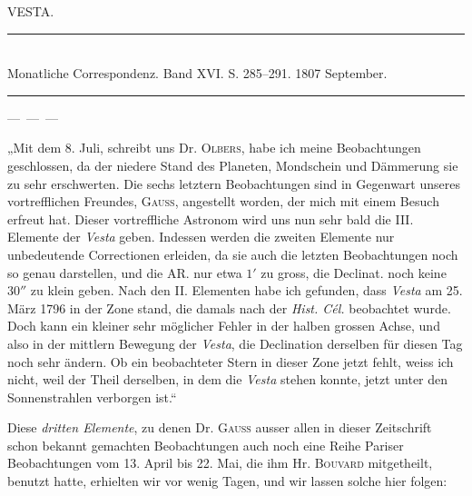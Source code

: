 \clearpage
{}
\hypertarget{native-295-lower}{}
\centerline{VESTA.}

\begin{center}
\rule{0.5\linewidth}{0.4pt}\\[2pt]
Monatliche Correspondenz. Band XVI. S. 285–291. 1807 September.\\[2pt]
\rule{0.5\linewidth}{0.4pt}
\end{center}

\smallskip
\noindent---\ ---\ ---

\smallskip
\par\indent „Mit dem 8. Juli, schreibt uns Dr. \textsc{Olbers}, habe ich meine Beobachtungen geschlossen, da der
niedere Stand des Planeten, Mondschein und Dämmerung sie zu sehr erschwerten. Die sechs letztern
Beobachtungen sind in Gegenwart unseres vortrefflichen Freundes, \textsc{Gauss}, angestellt worden, der mich
mit einem Besuch erfreut hat. Dieser vortreffliche Astronom wird uns nun sehr bald die III. Elemente
der \emph{Vesta} geben. Indessen werden die zweiten Elemente nur unbedeutende Correctionen erleiden, da sie
auch die letzten Beobachtungen noch so genau darstellen, und die AR. nur etwa $1'$ zu gross, die Declinat.
noch keine $30''$ zu klein geben. Nach den II. Elementen habe ich gefunden, dass \emph{Vesta} am 25. März
1796 in der Zone stand, die damals nach der \emph{Hist. Cél.} beobachtet wurde. Doch kann ein kleiner sehr
möglicher Fehler in der halben grossen Achse, und also in der mittlern Bewegung der \emph{Vesta}, die Declination derselben für diesen Tag noch sehr ändern. Ob ein beobachteter Stern in dieser Zone jetzt fehlt,
weiss ich nicht, weil der Theil derselben, in dem die \emph{Vesta} stehen konnte, jetzt unter den Sonnenstrahlen verborgen ist.“

\par\indent Diese \emph{dritten Elemente}, zu denen Dr. \textsc{Gauss} ausser allen in dieser Zeitschrift schon bekannt gemachten Beobachtungen auch noch eine Reihe Pariser Beobachtungen vom 13. April bis 22. Mai, die ihm
Hr. \textsc{Bouvard} mitgetheilt, benutzt hatte, erhielten wir vor wenig Tagen, und wir lassen solche hier
folgen:

\smallskip

